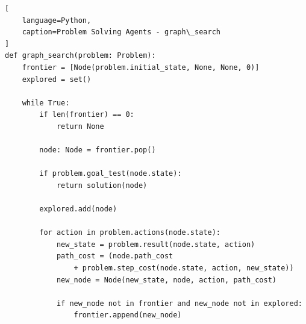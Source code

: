 \begin{algorithm}[H]
    \caption{An informal description of the general graph-search algorithm. The parts of \textsc{Graph-Search} marked in bold italic are the additions needed to handle repeated states. \cite{ai/book/Artificial-Intelligence-A-Modern-Approach/Russell-Norvig}}

\end{algorithm}

\begin{lstlisting}[
    language=Python,
    caption=Problem Solving Agents - graph\_search
]
def graph_search(problem: Problem):
    frontier = [Node(problem.initial_state, None, None, 0)]
    explored = set()

    while True:
        if len(frontier) == 0:
            return None

        node: Node = frontier.pop()

        if problem.goal_test(node.state):
            return solution(node)

        explored.add(node)

        for action in problem.actions(node.state):
            new_state = problem.result(node.state, action)
            path_cost = (node.path_cost
                + problem.step_cost(node.state, action, new_state))
            new_node = Node(new_state, node, action, path_cost)
            
            if new_node not in frontier and new_node not in explored:
                frontier.append(new_node)
\end{lstlisting}


